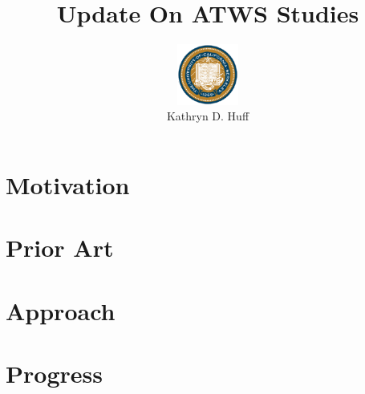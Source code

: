 \documentclass[mathserif]{beamer}
\begin{document}
\title{Update On ATWS Studies}
\author[Kathryn D. Huff]{\includegraphics[height=2cm]{bk}\\Kathryn D.  Huff}
\maketitle

\section{Motivation}

\section{Prior Art}

\section{Approach}

\section{Progress}

\end{document}
